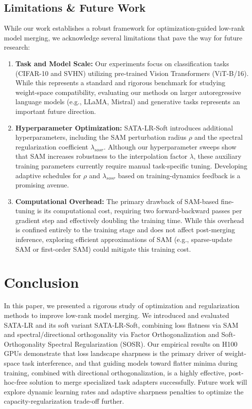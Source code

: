 \documentclass{article}
\begin{document}
\subsection{Limitations \& Future Work}
While our work establishes a robust framework for optimization-guided low-rank model merging, we acknowledge several limitations that pave the way for future research:
\begin{enumerate}\setlength{\itemsep}{0pt}\setlength{\parsep}{0pt}
    \item \textbf{Task and Model Scale:} Our experiments focus on classification tasks (CIFAR-10 and SVHN) utilizing pre-trained Vision Transformers (ViT-B/16). While this represents a standard and rigorous benchmark for studying weight-space compatibility, evaluating our methods on larger autoregressive language models (e.g., LLaMA, Mistral) and generative tasks represents an important future direction.
    \item \textbf{Hyperparameter Optimization:} SATA-LR-Soft introduces additional hyperparameters, including the SAM perturbation radius $\rho$ and the spectral regularization coefficient $\lambda_{sosr}$. Although our hyperparameter sweeps show that SAM increases robustness to the interpolation factor $\lambda$, these auxiliary training parameters currently require manual task-specific tuning. Developing adaptive schedules for $\rho$ and $\lambda_{sosr}$ based on training-dynamics feedback is a promising avenue.
    \item \textbf{Computational Overhead:} The primary drawback of SAM-based fine-tuning is its computational cost, requiring two forward-backward passes per gradient step and effectively doubling the training time. While this overhead is confined entirely to the training stage and does not affect post-merging inference, exploring efficient approximations of SAM (e.g., sparse-update SAM or first-order SAM) could mitigate this training cost.
\end{enumerate}

\section{Conclusion}
In this paper, we presented a rigorous study of optimization and regularization methods to improve low-rank model merging. We introduced and evaluated SATA-LR and its soft variant SATA-LR-Soft, combining loss flatness via SAM and spectral/directional orthogonality via Factor Orthogonalization and Soft-Orthogonality Spectral Regularization (SOSR). Our empirical results on H100 GPUs demonstrate that loss landscape sharpness is the primary driver of weight-space task interference, and that guiding models toward flatter minima during training, combined with directional orthogonalization, is a highly effective, post-hoc-free solution to merge specialized task adapters successfully. Future work will explore dynamic learning rates and adaptive sharpness penalties to optimize the capacity-regularization trade-off further.



\end{document}

